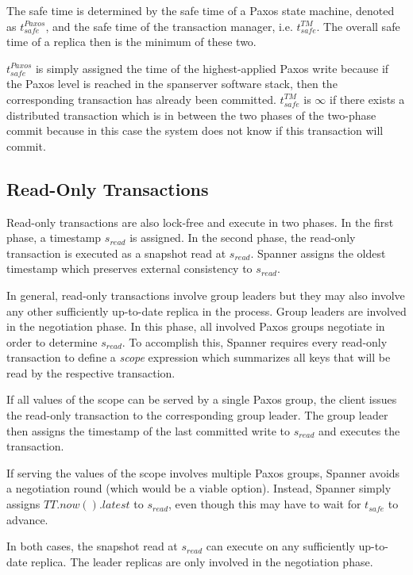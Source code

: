\documentclass[onecolumn, a4paper, 10pt]{article}
\begin{document}
The safe time is determined by the safe time of a Paxos state machine, denoted
as $t_{safe}^{Paxos}$, and the safe time of the transaction manager, i.e.
$t_{safe}^{TM}$. The overall safe time of a replica then is the minimum of
these two.

$t_{safe}^{Paxos}$ is simply assigned the time of the highest-applied Paxos write
because if the Paxos level is reached in the spanserver software stack, then the
corresponding transaction has already been committed. $t_{safe}^{TM}$ is $\infty$
if there exists a distributed transaction which is in between the two phases of
the two-phase commit because in this case the system does not know if this
transaction will commit.

\subsection{Read-Only Transactions}
\label{subsec:read-only-transactions}

Read-only transactions are also lock-free and execute in two phases. In the first
phase, a timestamp $s_{read}$ is assigned. In the second phase, the read-only
transaction is executed as a snapshot read at $s_{read}$. Spanner assigns
the oldest timestamp which preserves external consistency to $s_{read}$.

In general, read-only transactions involve group leaders but they may also involve
any other sufficiently up-to-date replica in the process. Group leaders are
involved in the negotiation phase. In this phase, all involved Paxos groups
negotiate in order to determine $s_{read}$. To accomplish this, Spanner requires
every read-only transaction to define a \emph{scope} expression which summarizes
all keys that will be read by the respective transaction.

If all values of the scope can be served by a single Paxos group, the client
issues the read-only transaction to the corresponding group leader. The group
leader then assigns the timestamp of the last committed write to $s_{read}$ and
executes the transaction.

If serving the values of the scope involves multiple Paxos groups, Spanner avoids
a negotiation round (which would be a viable option). Instead, Spanner simply
assigns $TT.now().latest$ to $s_{read}$, even though this may have to wait for
$t_{safe}$ to advance.

In both cases, the snapshot read at $s_{read}$ can execute on any sufficiently
up-to-date replica. The leader replicas are only involved in the negotiation
phase.
\end{document}
